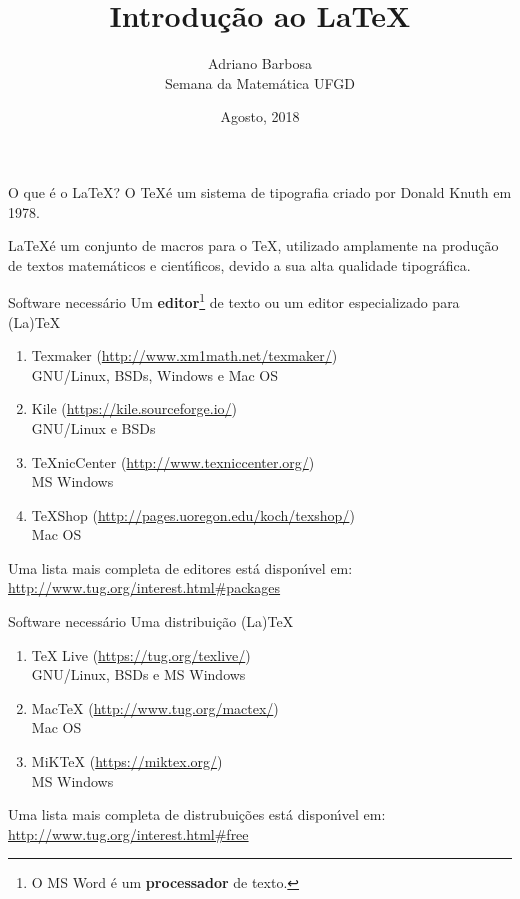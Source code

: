 \documentclass{beamer}
\author{Adriano Barbosa\\
    Semana da Matem\'atica UFGD
}
\title{Introdu\c{c}\~ao ao \LaTeX}
\date{Agosto, 2018}
\begin{document}
\begin{frame}
	\maketitle
\end{frame}

\begin{frame}{O que \'e o \LaTeX?}
    O \TeX \'e um sistema de tipografia criado por Donald Knuth em 1978.

    \vspace{1cm}
    \pause

    \LaTeX \'e um conjunto de macros para o \TeX, utilizado amplamente na
    produ\c{c}\~ao de textos matem\'aticos e cient\'{\i}ficos, devido a sua alta qualidade
    tipogr\'afica.
\end{frame}

\begin{frame}[fragile]{Software necess\'ario}
    Um \textbf{editor}\footnote{O MS Word \'e um \textbf{processador} de texto.} de
    texto ou um editor especializado para (La)TeX
        \begin{enumerate}
            \item Texmaker (\url{http://www.xm1math.net/texmaker/}) \\ GNU/Linux, BSDs, Windows e Mac OS
            \item Kile (\url{https://kile.sourceforge.io/})\\ GNU/Linux e BSDs
            \item TeXnicCenter (\url{http://www.texniccenter.org/})\\ MS Windows
            \item TeXShop (\url{http://pages.uoregon.edu/koch/texshop/})\\ Mac OS
        \end{enumerate}

    \vspace{1cm}
    Uma lista mais completa de editores est\'a dispon\'{\i}vel em:
    \url{http://www.tug.org/interest.html#packages}
\end{frame}

\begin{frame}[fragile]{Software necess\'ario}
    Uma distribui\c{c}\~ao (La)TeX
        \begin{enumerate}
            \item TeX Live (\url{https://tug.org/texlive/})\\ GNU/Linux, BSDs e MS Windows
            \item MacTeX (\url{http://www.tug.org/mactex/})\\ Mac OS
            \item MiKTeX (\url{https://miktex.org/})\\ MS Windows
        \end{enumerate}

    \vspace{1cm}
    Uma lista mais completa de distrubui\c{c}\~oes est\'a dispon\'{\i}vel em:
    \url{http://www.tug.org/interest.html#free}
\end{frame}
\end{document}

